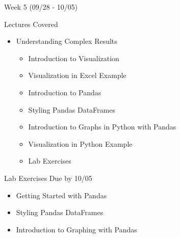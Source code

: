 \documentclass[]{article}
\begin{document}
\begin{section}{Week 5 (09/28 - 10/05)}
\begin{subsection}{Lectures Covered}
\begin{itemize}
\item Understanding Complex Results
\begin{itemize}
\item Introduction to Visualization
\item Visualization in Excel Example
\item Introduction to Pandas
\item Styling Pandas DataFrames
\item Introduction to Graphs in Python with Pandas
\item Visualization in Python Example
\item Lab Exercises
\end{itemize}
\end{itemize}
\end{subsection}
\begin{subsection}{Lab Exercises Due by 10/05}
\begin{itemize}
\item Getting Started with Pandas
\item Styling Pandas DataFrames
\item Introduction to Graphing with Pandas
\end{itemize}
\end{subsection}
\end{section}
\end{document}
